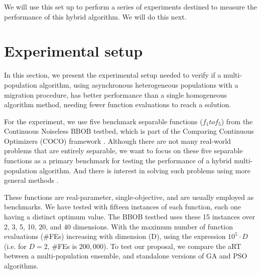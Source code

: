 \documentclass[runningheads]{llncs}
\begin{document}
We will use this set up to perform a series of experiments destined to
measure the performance of this hybrid algorithm. We will do this next.



\section{Experimental setup}
\label{setup}

In this section, we present the experimental setup needed 
to verify if a multi-population algorithm, using asynchronous
heterogeneous populations with a migration procedure, has better performance 
than a single homogeneous algorithm method, needing fewer function evaluations to 
reach a solution. %

For the experiment, we use five
benchmark separable functions ($f_1 to f_5 $) from the Continuous Noiseless
BBOB testbed, which is part of the Comparing Continuous Optimizers (COCO)
framework \cite{hansen2016coco}. Although there are not many real-world
problems that are entirely separable, we want to focus on these five separable functions
as a primary benchmark for testing the performance of a hybrid multi-population
algorithm. And there is interest in solving such problems using more
general methods \cite{doerr2013evolutionary,swarzberg1994step}. 

These functions are real-parameter, single-objective, and are
usually employed as benchmarks. We have tested with fifteen instances of each
function, each one having a distinct optimum value. The BBOB testbed %
uses these 15 instances over 2, 3, 5, 10, 20, and
40 dimensions. With the maximum number of function evaluations (\#FEs)
increasing with dimension (D), using the expression $10^5 \cdot D$ (i.e.
for $D = 2$, \#FEs is $200,000$).
%
To test our proposal, we compare the aRT between 
a multi-population ensemble, and standalone versions of GA 
and PSO algorithms.
\end{document}
